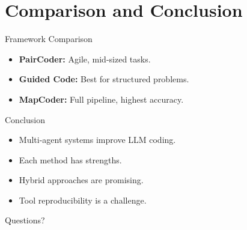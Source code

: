 \documentclass{beamer}
\begin{document}
	\section{Comparison and Conclusion}
	\begin{frame}{Framework Comparison}
	  \begin{itemize}
	    \item \textbf{PairCoder:} Agile, mid-sized tasks.
	    \item \textbf{Guided Code:} Best for structured problems.
	    \item \textbf{MapCoder:} Full pipeline, highest accuracy.
	  \end{itemize}
	\end{frame}
	
	\begin{frame}{Conclusion}
	  \begin{itemize}
	    \item Multi-agent systems improve LLM coding.
	    \item Each method has strengths.
	    \item Hybrid approaches are promising.
	    \item Tool reproducibility is a challenge.
	  \end{itemize}
	\end{frame}
	
	\begin{frame}
	  \centering
	  \Huge Questions?
	\end{frame}
	
	
\end{document}
